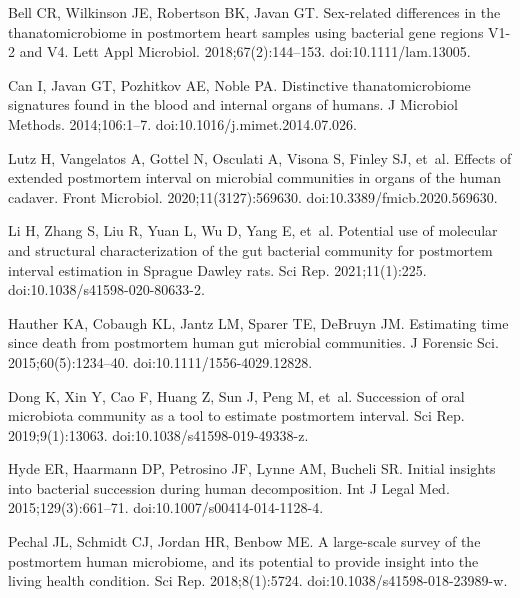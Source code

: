 \documentclass[
  10pt,
  letterpaper,
]{article}
\begin{document}
\begin{thebibliography}{10}
    Bell CR, Wilkinson JE, Robertson BK, Javan GT.
    \newblock Sex-related differences in the thanatomicrobiome in postmortem heart samples using bacterial gene regions {V1}-2 and {V4}.
    \newblock Lett Appl Microbiol. 2018;67(2):144--153.
    \newblock doi:{10.1111/lam.13005}.
    
    Can I, Javan GT, Pozhitkov AE, Noble PA.
    \newblock Distinctive thanatomicrobiome signatures found in the blood and internal organs of humans.
    \newblock J Microbiol Methods. 2014;106:1--7.
    \newblock doi:{10.1016/j.mimet.2014.07.026}.
    
    Lutz H, Vangelatos A, Gottel N, Osculati A, Visona S, Finley SJ, et~al.
    \newblock Effects of extended postmortem interval on microbial communities in organs of the human cadaver.
    \newblock Front Microbiol. 2020;11(3127):569630.
    \newblock doi:{10.3389/fmicb.2020.569630}.
    
    Li H, Zhang S, Liu R, Yuan L, Wu D, Yang E, et~al.
    \newblock Potential use of molecular and structural characterization of the gut bacterial community for postmortem interval estimation in {Sprague} {Dawley} rats.
    \newblock Sci Rep. 2021;11(1):225.
    \newblock doi:{10.1038/s41598-020-80633-2}.
    
    Hauther KA, Cobaugh KL, Jantz LM, Sparer TE, DeBruyn JM.
    \newblock Estimating time since death from postmortem human gut microbial communities.
    \newblock J Forensic Sci. 2015;60(5):1234--40.
    \newblock doi:{10.1111/1556-4029.12828}.
    
    Dong K, Xin Y, Cao F, Huang Z, Sun J, Peng M, et~al.
    \newblock Succession of oral microbiota community as a tool to estimate postmortem interval.
    \newblock Sci Rep. 2019;9(1):13063.
    \newblock doi:{10.1038/s41598-019-49338-z}.
    
    Hyde ER, Haarmann DP, Petrosino JF, Lynne AM, Bucheli SR.
    \newblock Initial insights into bacterial succession during human decomposition.
    \newblock Int J Legal Med. 2015;129(3):661--71.
    \newblock doi:{10.1007/s00414-014-1128-4}.
    
    Pechal JL, Schmidt CJ, Jordan HR, Benbow ME.
    \newblock A large-scale survey of the postmortem human microbiome, and its potential to provide insight into the living health condition.
    \newblock Sci Rep. 2018;8(1):5724.
    \newblock doi:{10.1038/s41598-018-23989-w}.
    

\end{thebibliography}
\end{document}
